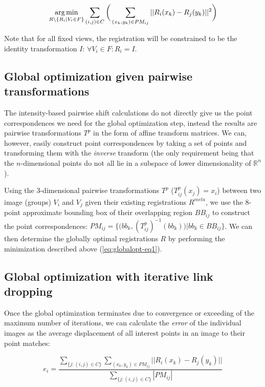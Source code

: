 \begin{equation}
\label{eq:globalopt-eq1}
\operatorname*{arg\,min}_{R \setminus \{R_i | V_i \in F\}} \sum_{(i,j) \in C} \bigg( \sum_{(x_{k}, y_{k}) \in PM_{ij}} || R_{i}( x_{k}) - R_{j}( y_{k}) ||^2 \bigg)
\end{equation}

Note that for all fixed views, the registration will be constrained to be the identity transformation $I$: $\forall V_i \in F: R_{i} = I$.

\subsection*{Global optimization given pairwise transformations}

The intensity-based pairwise shift calculations do not directly give us the point correspondences we need for the global optimization step, instead the results are pairwise transformations $T^{p}$ in the form of affine transform matrices. We can, however, easily construct point correspondences by taking a set of points and transforming them with the \emph{inverse} transform (the only requirement being that the $n$-dimensional points do not all lie in a subspace of lower dimensionality of $\mathbb{R}^n$).  

Using the 3-dimensional pairwise transformations $T^{p}$ ($T^p_{ij} (x_{j}) = x_i$) between two image (groups) $V_i$ and $V_j$ given their existing registrations $R^{meta}$, we use the 8-point approximate bounding box of their overlapping region $BB_{ij}$ to construct the point correspondences: $PM_{ij} = \{ \big(bb_k, (T^p_{ij})^{-1}(bb_k) \big) | bb_k \in BB_{ij}\}$. We can then determine the globally optimal registrations $R$ by performing the minimization described above (\ref{eq:globalopt-eq1}).  

\subsection*{Global optimization with iterative link dropping}

Once the global optimization terminates due to convergence or exceeding of the maximum number of iterations, we can calculate the \emph{error} of the individual images as the average displacement of all interest points in an image to their point matches:

\begin{equation}
\label{eq:gloablopt-eq2}
e_i = \frac{\sum_{\{j: (i,j) \in C\}}  \sum_{(x_{k}, y_{k}) \in PM_{ij}} || R_{i}( x_{k}) - R_{j}( y_{k}) ||  }{ \sum_{\{j: (i,j) \in C\}} |PM_{ij}| }
\end{equation}

